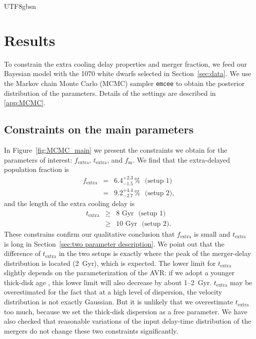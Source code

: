 \documentclass[twocolumn, times, trackchanges]{aastex63_bren}
\begin{document}
\begin{CJK*}{UTF8}{gbsn}
\section{Results}
\label{sec:results}

To constrain the extra cooling delay properties and merger fraction, we feed our Bayesian model with the 1070 white dwarfs selected in Section~\ref{sec:data}. We use the Markov chain Monte Carlo (MCMC) sampler \texttt{emcee} \citep{Foreman-Mackey_2013} to obtain the posterior distribution of the parameters. Details of the settings are described in \ref{app:MCMC}. 


\subsection{Constraints on the main parameters}
\label{sec:constraints}

In Figure~\ref{fig:MCMC_main} we present the constraints we obtain for the parameters of interest: $f_\text{extra}$, $t_\text{extra}$, and $f_\text{m}$. We find that the extra-delayed population fraction is
\begin{eqnarray}
\label{eq:f_extra}
    f_\text{extra}&=&6.4^{+2.3}_{-1.5}\,\%\text{~ (setup 1)}\nonumber\\
    &=&9.2^{+4.4}_{-2.7}\,\%\text{~ (setup 2),}
\end{eqnarray}
and the length of the extra cooling delay is
\begin{eqnarray}
\label{eq:t_extra}
    t_\text{extra}&\geq&\text{8 Gyr~ (setup 1)}\nonumber\\
    &\geq&\text{10 Gyr~ (setup 2).}
\end{eqnarray}
These constrains confirm our qualitative conclusion that $f_\text{extra}$ is small and $t_\text{extra}$ is long in Section~\ref{sec:two parameter description}. We point out that the difference of $t_\text{extra}$ in the two setups is exactly where the peak of the merger-delay distribution is located (2~Gyr), which is expected. The lower limit for $t_\text{extra}$ slightly depends on the parameterization of the AVR: if we adopt a younger thick-disk age \citep[7--11~Gyr instead of 9--11~Gyr,][]{Mackereth_2019}, this lower limit will also decrease by about 1--2~Gyr. $t_\text{extra}$ may be overestimated for the fact that at a high level of dispersion, the velocity distribution is not exactly Gaussian. But it is unlikely that we overestimate $t_\text{extra}$ too much, because we set the thick-disk dispersion as a free parameter. We have also checked that reasonable variations of the input delay-time distribution of the mergers \citep[e.g.,][]{Toonen_2012} do not change these two constraints significantly.


\end{CJK*}
\end{document}
